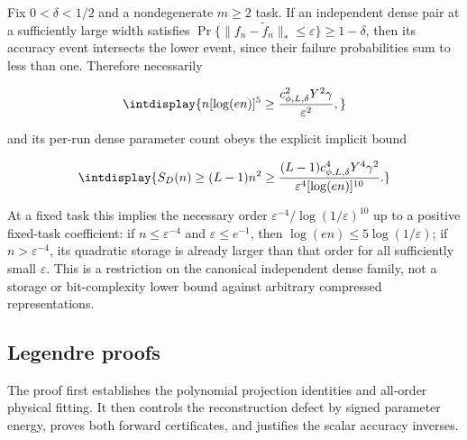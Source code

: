 
Fix \(0<\delta<1/2\) and a nondegenerate \(m\ge2\) task. If an independent dense pair at a sufficiently large width satisfies \(\Pr\{\|f_n-\widetilde f_n\|_*\le\varepsilon\}\ge1-\delta\), then its accuracy event intersects the lower event, since their failure probabilities sum to less than one. Therefore necessarily


\begingroup\renewcommand{\theHequation}{intdisplay.508}
\begin{equation*}
\intdisplay{
n[\log(en)]^5\ge
\frac{c_{\phi,L,\delta}^2Y^2\gamma}{\varepsilon^2},
}
\end{equation*}
\endgroup


and its per-run dense parameter count obeys the explicit implicit bound


\begingroup\renewcommand{\theHequation}{intdisplay.509}
\begin{equation*}
\intdisplay{
S_D(n)\ge(L-1)n^2\ge
\frac{(L-1)c_{\phi,L,\delta}^4Y^4\gamma^2}
{\varepsilon^4[\log(en)]^{10}}.
}
\end{equation*}
\endgroup


At a fixed task this implies the necessary order \(\varepsilon^{-4}/\log(1/\varepsilon)^{10}\) up to a positive fixed-task coefficient: if \(n\le\varepsilon^{-4}\) and \(\varepsilon\le e^{-1}\), then \(\log(en)\le5\log(1/\varepsilon)\); if \(n>\varepsilon^{-4}\), its quadratic storage is already larger than that order for all sufficiently small \(\varepsilon\). This is a restriction on the canonical independent dense family, not a storage or bit-complexity lower bound against arbitrary compressed representations.


\subsection{Legendre proofs}
\label{int:legendre-proofs}


The proof first establishes the polynomial projection identities and all-order physical fitting. It then controls the reconstruction defect by signed parameter energy, proves both forward certificates, and justifies the scalar accuracy inverses.


